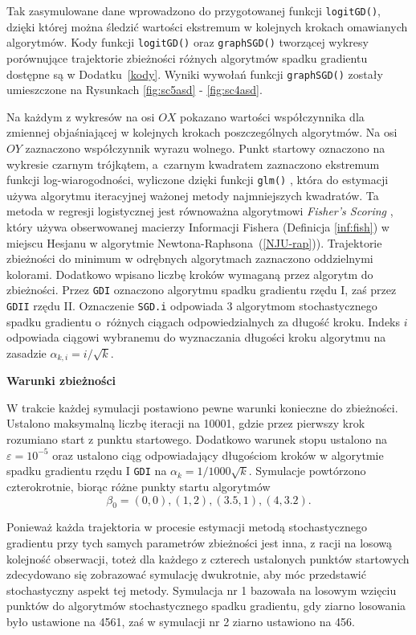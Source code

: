 Tak zasymulowane dane wprowadzono do przygotowanej funkcji \texttt{logitGD()}, dzięki której można śledzić wartości ekstremum w kolejnych krokach omawianych algorytmów. Kody funkcji \texttt{logitGD()} oraz \texttt{graphSGD()} tworzącej wykresy porównujące trajektorie zbieżności różnych algorytmów spadku gradientu  dostępne są w Dodatku~\ref{kody}. Wyniki wywołań funkcji \texttt{graphSGD()} zostały umieszczone na Rysunkach \ref{fig:sc5asd} - \ref{fig:sc4asd}.

Na każdym z wykresów na osi $OX$ pokazano wartości współczynnika dla zmiennej objaśniającej w kolejnych krokach poszczególnych algorytmów. Na osi $OY$ zaznaczono współczynnik wyrazu wolnego. Punkt startowy oznaczono na wykresie czarnym trójkątem, a~czarnym kwadratem zaznaczono ekstremum funkcji log-wiarogodności, wyliczone dzięki funkcji \texttt{glm()} \citep{glmglm}, która do estymacji używa algorytmu iteracyjnej ważonej metody najmniejszych kwadratów. Ta metoda w regresji logistycznej jest równoważna algorytmowi \textit{Fisher's Scoring} \citep{scoring1, scoring2}, który używa obserwowanej macierzy Informacji Fishera (Definicja \ref{inf:fish}) w miejscu Hesjanu w algorytmie Newtona-Raphsona~(\ref{NJU-rap})). Trajektorie zbieżności do minimum w odrębnych algorytmach zaznaczono oddzielnymi kolorami. Dodatkowo wpisano liczbę kroków wymaganą przez algorytm do zbieżności. Przez \texttt{GDI} oznaczono algorytmu spadku gradientu rzędu I, zaś przez \texttt{GDII} rzędu II. Oznaczenie \texttt{SGD.i} odpowiada 3 algorytmom stochastycznego spadku gradientu o~różnych ciągach odpowiedzialnych za długość kroku. Indeks $i$ odpowiada ciągowi wybranemu do wyznaczania długości kroku algorytmu na zasadzie $\alpha_{k,i} = i/\sqrt{k}$.

\textbf{Warunki zbieżności}

W trakcie każdej symulacji postawiono pewne warunki konieczne do zbieżności. Ustalono maksymalną liczbę iteracji na 10001, gdzie przez pierwszy krok rozumiano start z punktu startowego. Dodatkowo warunek stopu ustalono na $\varepsilon=10^{-5}$ oraz ustalono ciąg odpowiadający długościom kroków w algorytmie spadku gradientu rzędu I \texttt{GDI} na $\alpha_{k} = 1/1000\sqrt{k}$. Symulacje powtórzono czterokrotnie, biorąc różne punkty startu algorytmów $$\beta_0 = (0,0), (1,2), (3.5,1), (4,3.2).$$

Ponieważ każda trajektoria w procesie estymacji metodą stochastycznego gradientu przy tych samych parametrów zbieżności jest inna, z racji na losową kolejność obserwacji, toteż dla każdego z czterech ustalonych punktów startowych zdecydowano się zobrazować symulację dwukrotnie, aby móc przedstawić stochastyczny aspekt tej metody. Symulacja nr 1 bazowała na losowym wzięciu punktów do algorytmów stochastycznego spadku gradientu, gdy ziarno losowania było ustawione na 4561, zaś w symulacji nr 2 ziarno ustawiono na 456.

